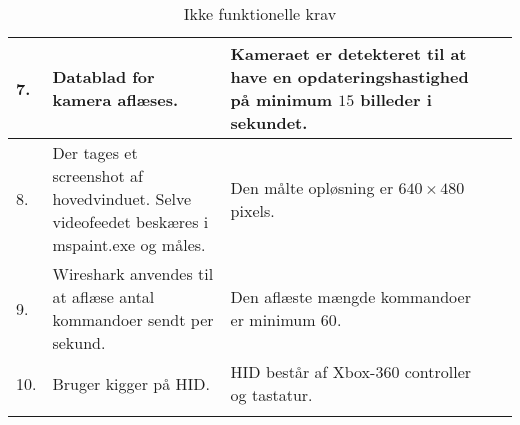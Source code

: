 \begin{longtable}{| l | L{4cm} | Z | Z | L{3 cm} |}
	7. 	& Datablad for kamera aflæses.
		& Kameraet er detekteret til at have en opdateringshastighed på minimum $15$ billeder i sekundet.
		& 
		& \\ \hline
       
    8. 	& Der tages et screenshot af hovedvinduet. Selve videofeedet beskæres i mspaint.exe og måles.
    	& Den målte opløsning er $640 \times 480$ pixels.
    	& 
    	& \\ \hline
    
    9. 	& Wireshark anvendes til at aflæse antal kommandoer sendt per sekund.
    	& Den aflæste mængde kommandoer er minimum $60$.
    	& 
    	& \\ \hline
    	
    10.	& Bruger kigger på HID.
    	& HID består af Xbox-360 controller og tastatur.
    	& 
    	& \\ \hline    	
    	
    
\caption{Ikke funktionelle krav}
\label{tbl:ikkefunk}
\end{longtable}
